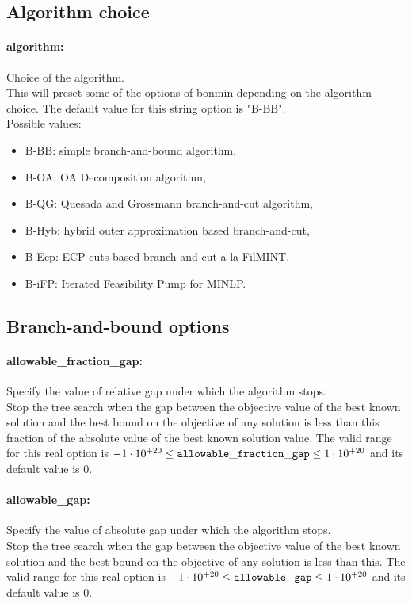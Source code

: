 \subsection{Algorithm choice}
\label{sec:Algorithmchoice}
\paragraph{algorithm:}\label{opt:algorithm} Choice of the algorithm. \\
 This will preset some of the options of bonmin depending on the algorithm choice. The default value for this string option is "B-BB".
\\ 
Possible values:
\begin{itemize}
   \item B-BB: simple branch-and-bound algorithm,
   \item B-OA: OA Decomposition algorithm,
   \item B-QG: Quesada and Grossmann branch-and-cut algorithm,
   \item B-Hyb: hybrid outer approximation based branch-and-cut,
   \item B-Ecp: ECP cuts based branch-and-cut a la FilMINT.
   \item B-iFP: Iterated Feasibility Pump for MINLP.
\end{itemize}

\subsection{Branch-and-bound options}
\label{sec:Branch-and-boundoptions}
\paragraph{allowable\_fraction\_gap:}\label{opt:allowable_fraction_gap} Specify the value of relative gap under which the algorithm stops. \\
 Stop the tree search when the gap between the objective value of the best known solution and the best bound on the objective of any solution is less than this fraction of the absolute value of the best known solution value. The valid range for this real option is 
$-1 \cdot 10^{+20} \le {\tt allowable\_fraction\_gap } \le 1 \cdot 10^{+20}$
and its default value is $0$.


\paragraph{allowable\_gap:}\label{opt:allowable_gap} Specify the value of absolute gap under which the algorithm stops. \\
 Stop the tree search when the gap between the objective value of the best known solution and the best bound on the objective of any solution is less than this. The valid range for this real option is 
$-1 \cdot 10^{+20} \le {\tt allowable\_gap } \le 1 \cdot 10^{+20}$
and its default value is $0$.


